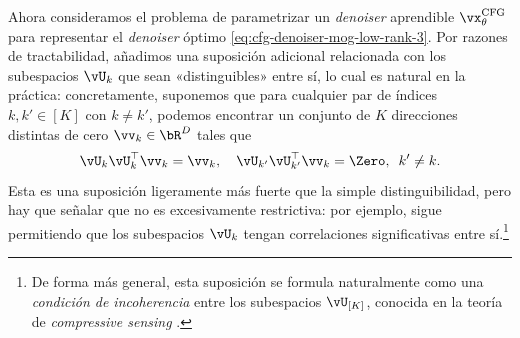 \documentclass[../../book-main_es.tex]{subfiles}
\begin{document}
\begin{example}
    Ahora consideramos el problema de parametrizar un \textit{denoiser} aprendible
    $\vx_{\theta}^{\mathrm{CFG}}$ para representar el \textit{denoiser} óptimo
    \eqref{eq:cfg-denoiser-mog-low-rank-3}.
    Por razones de tractabilidad, añadimos una suposición adicional relacionada con
    los subespacios
    $\vU_k$ que sean «distinguibles» entre sí, lo cual es natural en
    la práctica: concretamente, suponemos que para cualquier par de índices $k, k' \in
    [K]$ con $k \neq k'$, podemos encontrar un conjunto de $K$ direcciones distintas de cero
    $\vv_{k} \in \bR^D$ tales
    que
    \begin{equation}
        \vU_{k}\vU_{k}^\top \vv_k = \vv_k, \quad
        \vU_{k'}\vU_{k'}^\top \vv_k = \Zero, \enspace k' \neq k.
    \end{equation}
    Esta es una suposición ligeramente más fuerte que la simple
    distinguibilidad, pero
    hay que señalar que no es excesivamente restrictiva: por ejemplo, sigue
    permitiendo que los subespacios $\vU_{k}$ tengan correlaciones significativas entre
    sí.\footnote{De forma más general, esta suposición se formula naturalmente
        como una
        \textit{condición de incoherencia} entre los subespacios
        $\vU_{[K]}$, conocida en la teoría de \textit{compressive sensing}
    \cite{Wright-Ma-2022}.}


\end{example}
\end{document}
